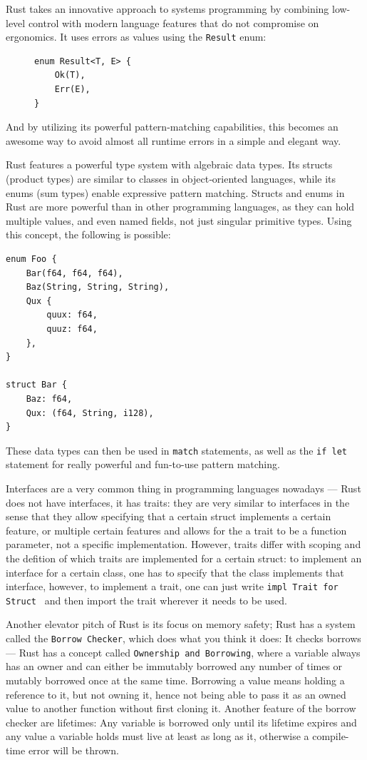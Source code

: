 Rust takes an innovative approach to systems programming by combining low-level control with modern language features
that do not compromise on ergonomics. It uses errors as values using the \texttt{Result} enum:

\begin{figure}[H]
    \begin{verbatim}
enum Result<T, E> {
    Ok(T),
    Err(E),
}
    \end{verbatim}
\end{figure}

And by utilizing its powerful pattern-matching capabilities, this becomes an awesome way to avoid almost all runtime errors
in a simple and elegant way.

Rust features a powerful type system with algebraic data types.
Its structs (product types) are similar to classes in object‑oriented languages,
while its enums (sum types) enable expressive pattern matching.
Structs and enums in Rust are more powerful than in other programming languages,
as they can hold multiple values, and even named fields, not just singular primitive types.
Using this concept, the following is possible:
\begin{verbatim}
enum Foo {
    Bar(f64, f64, f64),
    Baz(String, String, String),
    Qux {
        quux: f64,
        quuz: f64,
    },
}

struct Bar {
    Baz: f64,
    Qux: (f64, String, i128),
}
\end{verbatim}

These data types can then be used in \texttt{match} statements, as well as the \texttt{if let} statement
for really powerful and fun-to-use pattern matching.

Interfaces are a very common thing in programming languages nowadays ---
Rust does not have interfaces, it has traits: they are very similar to interfaces
in the sense that they allow specifying that a certain struct implements a certain feature,
or multiple certain features and allows for the a trait to be a function parameter,
not a specific implementation. However, traits differ with scoping and the defition of which traits are implemented for a certain struct:
to implement an interface for a certain class, one has to specify that the class implements that interface,
however, to implement a trait, one can just write \texttt{impl Trait for Struct {}} and then import the trait wherever it needs to be used.

Another elevator pitch of Rust is its focus on memory safety; Rust has a system called the \texttt{Borrow Checker}, which
does what you think it does: It checks borrows --- Rust has a concept called \texttt{Ownership and Borrowing},
where a variable always has an owner and can either be immutably borrowed any number of times or mutably borrowed once at the same time.
Borrowing a value means holding a reference to it, but not owning it, hence not being able to pass it as an owned value
to another function without first cloning it. Another feature of the borrow checker are lifetimes:
Any variable is borrowed only until its lifetime expires and any value a variable holds must live
at least as long as it, otherwise a compile-time error will be thrown.

